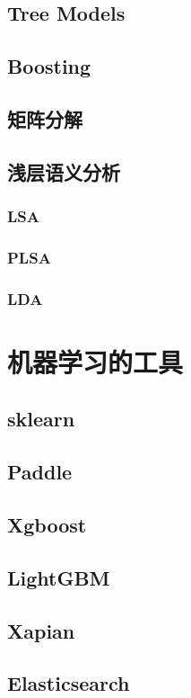 \documentclass[UTF8,10pt,a4paper]{ctexbook}
\begin{document}





\chapter{Tree Models}
\chapter{Boosting}
\chapter{矩阵分解}
\chapter{浅层语义分析}
    \section{LSA}
    \section{PLSA}
    \section{LDA}



\part{机器学习的工具}


\chapter{sklearn}

\chapter{Paddle}
\chapter{Xgboost}
\chapter{LightGBM}
\chapter{Xapian}
\chapter{Elasticsearch}
\end{document}
